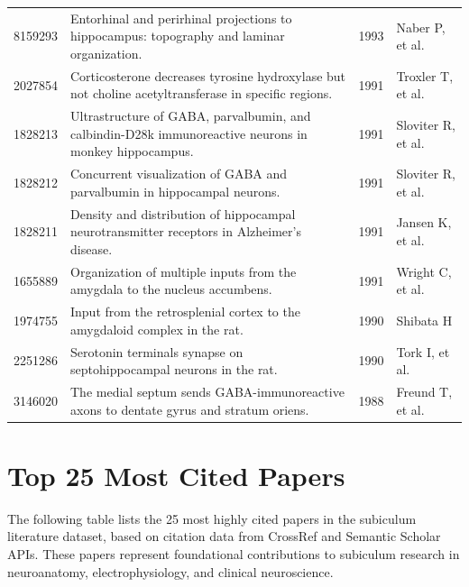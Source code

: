 \documentclass{../latex/analysis_report}
\begin{document}
\begin{longtable}{rp{6cm}lp{2.5cm}}
8159293 & Entorhinal and perirhinal projections to hippocampus: topography and laminar organization. & 1993 & Naber P, et al. \\
2027854 & Corticosterone decreases tyrosine hydroxylase but not choline acetyltransferase in specific regions. & 1991 & Troxler T, et al. \\
1828213 & Ultrastructure of GABA, parvalbumin, and calbindin-D28k immunoreactive neurons in monkey hippocampus. & 1991 & Sloviter R, et al. \\
1828212 & Concurrent visualization of GABA and parvalbumin in hippocampal neurons. & 1991 & Sloviter R, et al. \\
1828211 & Density and distribution of hippocampal neurotransmitter receptors in Alzheimer's disease. & 1991 & Jansen K, et al. \\
1655889 & Organization of multiple inputs from the amygdala to the nucleus accumbens. & 1991 & Wright C, et al. \\
1974755 & Input from the retrosplenial cortex to the amygdaloid complex in the rat. & 1990 & Shibata H \\
2251286 & Serotonin terminals synapse on septohippocampal neurons in the rat. & 1990 & Tork I, et al. \\
3146020 & The medial septum sends GABA-immunoreactive axons to dentate gyrus and stratum oriens. & 1988 & Freund T, et al. \\

\end{longtable}

\clearpage
\section{Top 25 Most Cited Papers}
\label{app:topcited}

The following table lists the 25 most highly cited papers in the subiculum literature dataset, based on citation data from CrossRef and Semantic Scholar APIs. These papers represent foundational contributions to subiculum research in neuroanatomy, electrophysiology, and clinical neuroscience.
\end{document}
